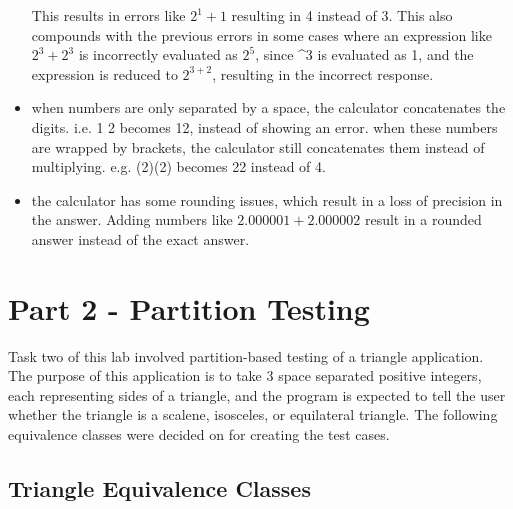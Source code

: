 \documentclass[letterpaper]{article}
\begin{document}
\begin{itemize}
          This results in errors like $2^1+1$ resulting in 4 instead of 3.
          This also compounds with the previous errors in some cases where an expression like $2^3 + 2^3$
          is incorrectly evaluated as $2^5$, since
          \textasciicircum 3
          is evaluated as 1, and the expression is reduced to $2^{3 + 2}$, resulting in the incorrect response.
    \item when numbers are only separated by a space, the calculator concatenates the digits. i.e. 1 2 becomes 12, instead of showing an error.
          when these numbers are wrapped by brackets, the calculator still concatenates them instead of multiplying. e.g. (2)(2) becomes 22 instead of 4.
    \item the calculator has some rounding issues, which result in a loss of precision in the answer. Adding numbers like $2.000001+2.000002$ result in a rounded
          answer instead of the exact answer.
\end{itemize}

\section*{Part 2 - Partition Testing}
Task two of this lab involved partition-based testing of a triangle application.
The purpose of this application is to take 3 space separated positive integers,
each representing sides of a triangle, and the program is expected to tell the
user whether the triangle is a scalene, isosceles, or equilateral triangle.
The following equivalence classes were decided on for creating the test cases.
\subsection*{Triangle Equivalence Classes}
\end{document}

